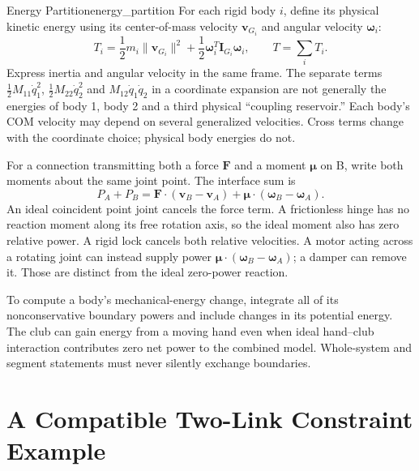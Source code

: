 \begin{definition}{Energy Partition}{energy_partition}
For each rigid body $i$, define its physical kinetic energy using its center-of-mass velocity $\bm v_{G_i}$ and angular velocity $\bm\omega_i$:
\begin{equation}
T_i=\frac12m_i\|\bm v_{G_i}\|^2
+\frac12\bm\omega_i^T\bm I_{G_i}\bm\omega_i,
\qquad T=\sum_iT_i.
\label{eq:energy_partition_definition}
\end{equation}
Express inertia and angular velocity in the same frame. The separate terms $\tfrac12M_{11}\dot q_1^2$, $\tfrac12M_{22}\dot q_2^2$ and $M_{12}\dot q_1\dot q_2$ in a coordinate expansion are not generally the energies of body 1, body 2 and a third physical ``coupling reservoir.'' Each body's COM velocity may depend on several generalized velocities. Cross terms change with the coordinate choice; physical body energies do not.

For a connection transmitting both a force $\bm F$ and a moment $\bm\mu$ on B, write both moments about the same joint point. The interface sum is
\begin{equation}
P_A+P_B=\bm F\cdot(\bm v_B-\bm v_A)
+\bm\mu\cdot(\bm\omega_B-\bm\omega_A).
\label{eq:energy_transfer_constraint}
\end{equation}
An ideal coincident point joint cancels the force term. A frictionless hinge has no reaction moment along its free rotation axis, so the ideal moment also has zero relative power. A rigid lock cancels both relative velocities. A motor acting across a rotating joint can instead supply power $\bm\mu\cdot(\bm\omega_B-\bm\omega_A)$; a damper can remove it. Those are distinct from the ideal zero-power reaction.

To compute a body's mechanical-energy change, integrate all of its nonconservative boundary powers and include changes in its potential energy. The club can gain energy from a moving hand even when ideal hand--club interaction contributes zero net power to the combined model. Whole-system and segment statements must never silently exchange boundaries.
\end{definition}

\section{A Compatible Two-Link Constraint Example}
\label{sec:double_pendulum_constraint_force}

